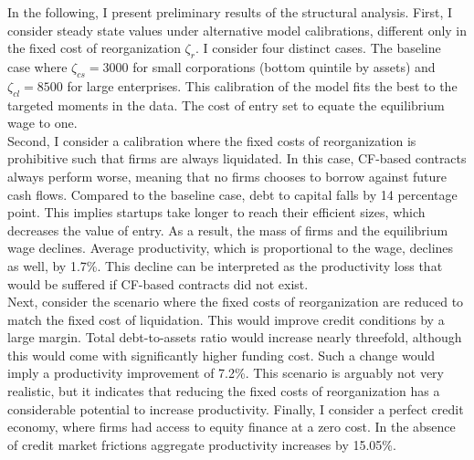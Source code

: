 \documentclass[12pt]{article}
\begin{document}
In the following, I present preliminary results of the structural analysis. First, I consider steady state values under alternative model calibrations, different only in the fixed cost of reorganization $\zeta_r$. I consider four distinct cases. The baseline case where $\zeta_{cs} = 3000$ for small corporations (bottom quintile by assets) and $\zeta_{cl} = 8500$ for large enterprises. This calibration of the model fits the best to the targeted moments in the data. The cost of entry set to equate the equilibrium wage to one. \vspace{3mm} \\
Second, I consider a calibration where the fixed costs of reorganization is prohibitive such that firms are always liquidated. In this case, CF-based contracts always perform worse, meaning that no firms chooses to borrow against future cash flows. Compared to the baseline case, debt to capital falls by 14 percentage point. This implies startups take longer to reach their efficient sizes, which decreases the value of entry. As a result, the mass of firms and the equilibrium wage declines. Average productivity, which is proportional to the wage, declines as well, by 1.7\%. This decline can be interpreted as the productivity loss that would be suffered if CF-based contracts did not exist. \vspace{3mm} \\
Next, consider the scenario where the fixed costs of reorganization are reduced to match the fixed cost of liquidation. This would improve credit conditions by a large margin. Total debt-to-assets ratio would increase nearly threefold, although this would come with significantly higher funding cost. Such a change would imply a productivity improvement of 7.2\%. This scenario is arguably not very realistic, but it indicates that reducing the fixed costs of reorganization has a considerable potential to increase productivity. Finally, I consider a perfect credit economy, where firms had access to equity finance at a zero cost. In the absence of credit market frictions aggregate productivity increases by 15.05\%.

\newpage
\end{document}

